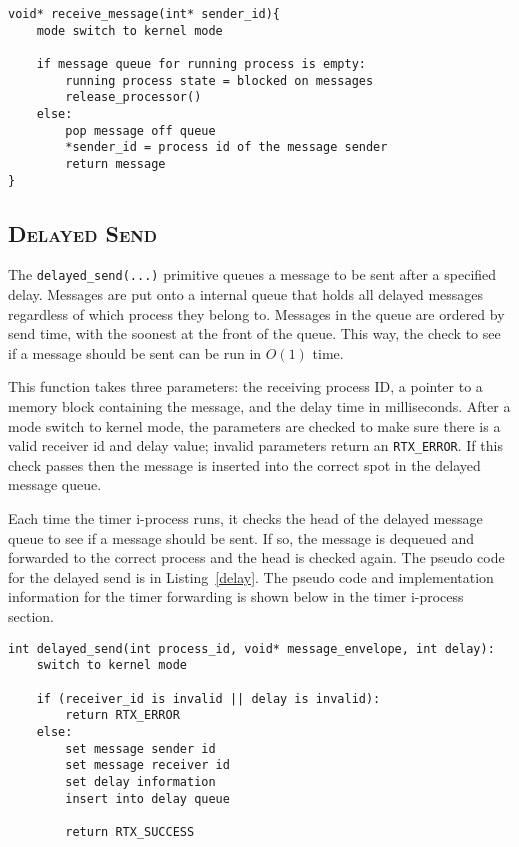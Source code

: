 \documentclass[oneside]{report}
\begin{document}
\begin{lstlisting}
void* receive_message(int* sender_id){
    mode switch to kernel mode

    if message queue for running process is empty:
        running process state = blocked on messages
        release_processor()
    else:
        pop message off queue
        *sender_id = process id of the message sender
        return message      
}
\end{lstlisting}

\subsection{\textsc{Delayed Send}}
The \texttt{delayed\_send(...)} primitive queues a message to be sent
after a specified delay. Messages are put onto a internal queue that
holds all delayed messages regardless of which process they belong to.
Messages in the queue are ordered by send time, with the soonest at
the front of the queue. This way, the check to see if a message should
be sent can be run in $O(1)$ time.

This function takes three parameters: the receiving process ID, a
pointer to a memory block containing the message, and the delay time
in milliseconds. After a mode switch to kernel mode, the parameters
are checked to make sure there is a valid receiver id and delay value;
invalid parameters return an \texttt{RTX\_ERROR}. If this check passes
then the message is inserted into the correct spot in the delayed
message queue.

Each time the timer i-process runs, it checks the head of the delayed
message queue to see if a message should be sent. If so, the message
is dequeued and forwarded to the correct process and the head is
checked again. The pseudo code for the delayed send is in
Listing~\ref{delay}. The pseudo code and implementation information
for the timer forwarding is shown below in the timer i-process
section.

\begin{lstlisting}
int delayed_send(int process_id, void* message_envelope, int delay):
    switch to kernel mode

    if (receiver_id is invalid || delay is invalid):
        return RTX_ERROR
    else:
        set message sender id
        set message receiver id
        set delay information
        insert into delay queue

        return RTX_SUCCESS
\end{lstlisting}
\end{document}
